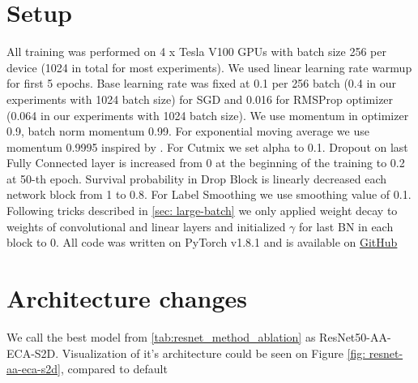 \section{Setup}
All training was performed on 4 x Tesla V100 GPUs with batch size 256 per device (1024 in total for most experiments). We used linear learning rate warmup for first 5 epochs. Base learning rate was fixed at 0.1 per 256 batch (0.4 in our experiments with 1024 batch size) for SGD and 0.016 for RMSProp optimizer (0.064 in our experiments with 1024 batch size). We use momentum in optimizer 0.9, batch norm momentum 0.99. For exponential moving average we use momentum 0.9995 inspired by \cite{tan2021_efficientnetv2}. For Cutmix we set alpha to 0.1. Dropout on last Fully Connected layer is increased from 0 at the beginning of the training to 0.2 at 50-th epoch. Survival probability in Drop Block is linearly decreased each network block from 1 to 0.8. For Label Smoothing we use smoothing value of 0.1. Following tricks described in \autoref{sec: large-batch} we only applied weight decay to weights of convolutional and linear layers and initialized $\gamma$ for last BN in each block to 0. All code was written on PyTorch v1.8.1 and is available on \href{https://github.com/bonlime/sota_imagenet/}{GitHub}

\section{Architecture changes}
We call the best model from \autoref{tab:resnet_method_ablation} as ResNet50-AA-ECA-S2D. Visualization of it's architecture could be seen on Figure \ref{fig: resnet-aa-eca-s2d}, compared to default 








